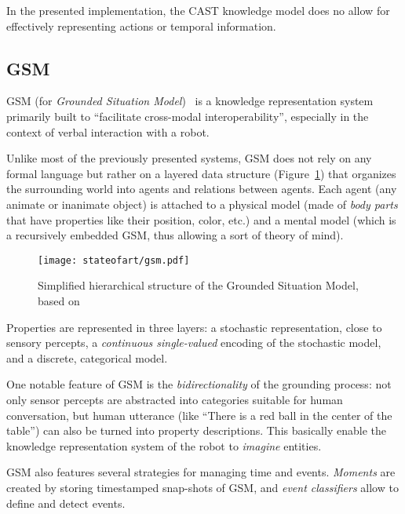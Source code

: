 In the presented implementation, the CAST knowledge model does no allow for
effectively representing actions or temporal information.

\subsection{GSM}
\label{sect|gsm}

GSM (for \emph{Grounded Situation Model})~\cite{Mavridis2006} is a knowledge
representation system primarily built to ``facilitate cross-modal
interoperability'',  especially in the context of verbal interaction with a
robot.

Unlike most of the previously presented systems, GSM does not rely on any
formal language but rather on a layered data structure (Figure~\ref{fig|gsm})
that organizes the surrounding world into agents and relations between agents.
Each agent (any animate or inanimate object) is attached to a physical model (made
of \emph{body parts} that have properties like their position, color, etc.) and
a mental model (which is a recursively embedded GSM, thus allowing a sort of
theory of mind).

\begin{figure}
    \centering
    \texttt{[image: stateofart/gsm.pdf]}

    \caption{Simplified hierarchical structure of the Grounded Situation Model,
    based on~\cite{Mavridis2006}}

    \label{fig|gsm}
\end{figure}

Properties are represented in three layers: a stochastic representation, close
to sensory percepts, a \emph{continuous single-valued} encoding of the
stochastic model, and a discrete, categorical model.

One notable feature of GSM is the \emph{bidirectionality} of the grounding
process: not only sensor percepts are abstracted into categories suitable for
human conversation, but human utterance (like ``There is a red ball in the
center of the table'') can also be turned into property descriptions. This
basically enable the knowledge representation system of the robot to
\emph{imagine} entities.

GSM also features several strategies for managing time and events.
\emph{Moments} are created by storing timestamped snap-shots of GSM, and
\emph{event classifiers} allow to define and detect events.

